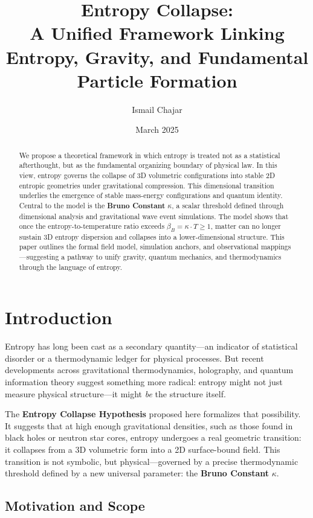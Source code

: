 \documentclass[12pt]{article}
\title{\textbf{Entropy Collapse:}\\A Unified Framework Linking Entropy, Gravity, and Fundamental Particle Formation}
\author[1]{Ismail Chajar}
\affil[1]{Independent Researcher, Entropy Physics Initiative}
\date{March 2025}
\begin{document}
\maketitle

\begin{abstract}
We propose a theoretical framework in which entropy is treated not as a statistical afterthought, but as the fundamental organizing boundary of physical law. In this view, entropy governs the collapse of 3D volumetric configurations into stable 2D entropic geometries under gravitational compression. This dimensional transition underlies the emergence of stable mass-energy configurations and quantum identity. Central to the model is the \textbf{Bruno Constant} $\kappa$, a scalar threshold defined through dimensional analysis and gravitational wave event simulations. The model shows that once the entropy-to-temperature ratio exceeds $\beta_B = \kappa \cdot T \geq 1$, matter can no longer sustain 3D entropy dispersion and collapses into a lower-dimensional structure. This paper outlines the formal field model, simulation anchors, and observational mappings—suggesting a pathway to unify gravity, quantum mechanics, and thermodynamics through the language of entropy.
\end{abstract}

\section{Introduction}

Entropy has long been cast as a secondary quantity—an indicator of statistical disorder or a thermodynamic ledger for physical processes. But recent developments across gravitational thermodynamics, holography, and quantum information theory suggest something more radical: entropy might not just measure physical structure—it might \textit{be} the structure itself.

The \textbf{Entropy Collapse Hypothesis} proposed here formalizes that possibility. It suggests that at high enough gravitational densities, such as those found in black holes or neutron star cores, entropy undergoes a real geometric transition: it collapses from a 3D volumetric form into a 2D surface-bound field. This transition is not symbolic, but physical—governed by a precise thermodynamic threshold defined by a new universal parameter: the \textbf{Bruno Constant} $\kappa$.
\FloatBarrier

\subsection*{Motivation and Scope}
\end{document}
